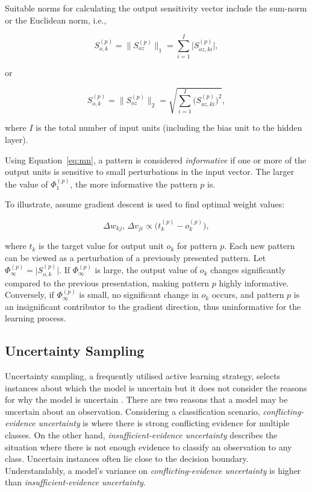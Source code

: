 \documentclass[10pt, conference]{IEEEtran}
\begin{document}
Suitable norms for calculating the output sensitivity vector include the sum-norm or the Euclidean norm, i.e.,

\begin{equation}
	S_{o,k}^{(p)} = \lVert {S}_{oz}^{(p)} \rVert_1 
	= \sum_{i=1}^{I} \big| S_{oz,ki}^{(p)} \big|,
\end{equation}

or

\begin{equation}
	S_{o,k}^{(p)} = \lVert {S}_{oz}^{(p)} \rVert_2 
	= \sqrt{ \sum_{i=1}^{I} \big( S_{oz,ki}^{(p)} \big)^2 },
\end{equation}

where $I$ is the total number of input units (including the bias unit to the hidden layer).  

Using Equation~\ref{eq:mn}, a pattern is considered \textit{informative} if one or more of the output units is sensitive to small perturbations in the input vector. The larger the value of $\Phi_1^{(p)}$, the more informative the pattern $p$ is.  

To illustrate, assume gradient descent is used to find optimal weight values:

\begin{equation}
	\Delta w_{kj}, \, \Delta v_{ji} \propto \big(t_k^{(p)} - o_k^{(p)}\big),
\end{equation}

where $t_k$ is the target value for output unit $o_k$ for pattern $p$.  
Each new pattern can be viewed as a perturbation of a previously presented pattern. Let $\Phi_\infty^{(p)} = \big| S_{o,k}^{(p)}\big|$. If $\Phi_\infty^{(p)}$ is large, the output value of $o_k$ changes significantly compared to the previous presentation, making pattern $p$ highly informative. Conversely, if $\Phi_\infty^{(p)}$ is small, no significant change in $o_k$ occurs, and pattern $p$ is an insignificant contributor to the gradient direction, thus uninformative for the learning process.


\subsection{Uncertainty Sampling}
Uncertainty sampling, a frequently utilised active learning strategy, selects instances about which the model is uncertain but it does not consider the reasons for why the model is uncertain \cite{alus}. There are two reasons that a model may be uncertain about an observation. Considering a classification scenario, \textit{conflicting-evidence uncertainty} is where there is strong conflicting evidence for multiple classes. On the other hand, \textit{insufficient-evidence uncertainty} describes the situation where there is not enough evidence to classify an observation to any class. Uncertain instances often lie close to the decision boundary. Understandably, a model's variance on \textit{conflicting-evidence uncertainty} is higher than \textit{insufficient-evidence uncertainty}. 
\end{document}

